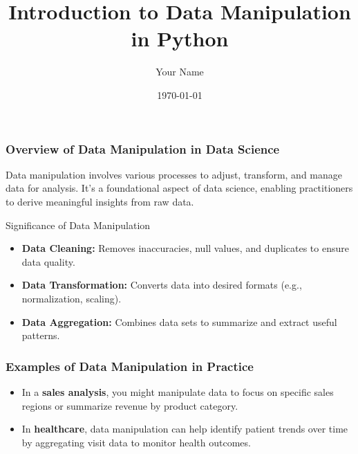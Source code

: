 \documentclass[aspectratio=169]{beamer}
\begin{document}
\frame{\titlepage}

\begin{frame}
    \title{Introduction to Data Manipulation in Python}
    \author{Your Name}
    \date{\today}
    \maketitle
\end{frame}

\begin{frame}
    \frametitle{Overview of Data Manipulation in Data Science}

    Data manipulation involves various processes to adjust, transform, and manage data for analysis. It's a foundational aspect of data science, enabling practitioners to derive meaningful insights from raw data.

    \begin{block}{Significance of Data Manipulation}
        \begin{itemize}
            \item \textbf{Data Cleaning:} Removes inaccuracies, null values, and duplicates to ensure data quality.
            \item \textbf{Data Transformation:} Converts data into desired formats (e.g., normalization, scaling).
            \item \textbf{Data Aggregation:} Combines data sets to summarize and extract useful patterns.
        \end{itemize}
    \end{block}
\end{frame}

\begin{frame}
    \frametitle{Examples of Data Manipulation in Practice}

    \begin{itemize}
        \item In a \textbf{sales analysis}, you might manipulate data to focus on specific sales regions or summarize revenue by product category.
        \item In \textbf{healthcare}, data manipulation can help identify patient trends over time by aggregating visit data to monitor health outcomes.
    \end{itemize}
\end{frame}
\end{document}
